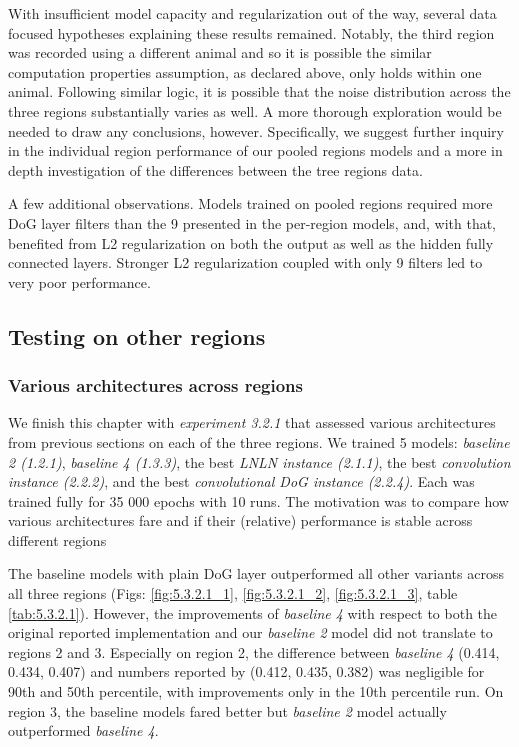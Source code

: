 With insufficient model capacity and regularization out of the way, several data focused hypotheses explaining these results remained. Notably, the third region was recorded using a different animal and so it is possible the similar computation properties assumption, as declared above, only holds within one animal. Following similar logic, it is possible that the noise distribution across the three regions substantially varies as well. A more thorough exploration would be needed to draw any conclusions, however. Specifically, we suggest further inquiry in the individual region performance of our pooled regions models and a more in depth investigation of the differences between the tree regions data.

A few additional observations. Models trained on pooled regions required more DoG layer filters than the 9 presented in the per-region models, and, with that, benefited from L2 regularization on both the output as well as the hidden fully connected layers. Stronger L2 regularization coupled with only 9 filters led to very poor performance. 

\subsection{Testing on other regions}\label{ch:5.3.2}
\subsubsection{Various architectures across regions}

We finish this chapter with \textit{experiment 3.2.1} that assessed various architectures from previous sections on each of the three regions. We trained 5 models: \textit{baseline 2 (1.2.1)}, \textit{baseline 4 (1.3.3)}, the best \textit{LNLN instance (2.1.1)}, the best \textit{convolution instance (2.2.2)}, and the best \textit{convolutional DoG instance (2.2.4)}. Each was trained fully for 35 000 epochs with 10 runs. The motivation was to compare how various architectures fare and if their (relative) performance is stable across different regions

The baseline models with plain DoG layer outperformed all other variants across all three regions (Figs: \ref{fig:5.3.2.1_1}, \ref{fig:5.3.2.1_2}, \ref{fig:5.3.2.1_3}, table \ref{tab:5.3.2.1}). However, the improvements of \textit{baseline 4} with respect to both the original reported \citeauthor{antolik} implementation and our \textit{baseline 2} model did not translate to regions 2 and 3. Especially on region 2, the difference between \textit{baseline 4} (0.414, 0.434, 0.407) and numbers reported by \citeauthor{antolik} (0.412, 0.435, 0.382) was negligible for 90th and 50th percentile, with improvements only in the 10th percentile run. On region 3, the baseline models fared better but \textit{baseline 2} model actually outperformed \textit{baseline 4}.

